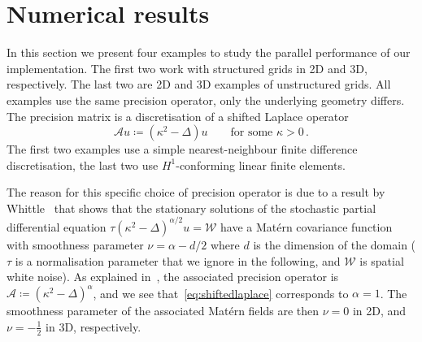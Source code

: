 \documentclass[
fontsize=11pt,
paper=a4,
numbers=noenddot
]{scrartcl}
\begin{document}


\section{Numerical results}\label{sec:numerics}
In this section we present four examples to study the parallel performance of our implementation. The first two work with structured grids in 2D and 3D, respectively. The last two are 2D and 3D examples of unstructured grids. All examples use the same precision operator, only the underlying geometry differs. The precision matrix is a discretisation of a shifted Laplace operator
\begin{equation}
    \label{eq:shiftedlaplace}
    \mathcal{A} u \coloneqq (\kappa^2 - \Delta) u \qquad \text{for some } \kappa > 0 \,.
\end{equation}
The first two examples use a simple nearest-neighbour finite difference discretisation, the last two use $H^1$-conforming linear finite elements.

The reason for this specific choice of precision operator is due to a result by Whittle~\cite{whittle} that shows that the stationary solutions of the stochastic partial differential equation $\tau (\kappa^2 - \Delta)^{\alpha/2} u = \mathcal{W}$ have a Mat\'ern covariance function with smoothness parameter $\nu = \alpha - d/2$ where $d$ is the dimension of the domain ($\tau$ is a normalisation parameter that we ignore in the following, and $\mathcal{W}$ is spatial white noise). As explained in~\cite[Sec.\ 2.2]{lindgrenSPDEApproachGaussian2022}, the associated precision operator is $\mathcal{A} \coloneqq {(\kappa^2 - \Delta)}^\alpha$, and we see that~\eqref{eq:shiftedlaplace} corresponds to $\alpha = 1$. The smoothness parameter of the associated Mat\'ern fields are then $\nu = 0$ in 2D, and $\nu = -\frac{1}{2}$ in 3D, respectively. 
\end{document}
